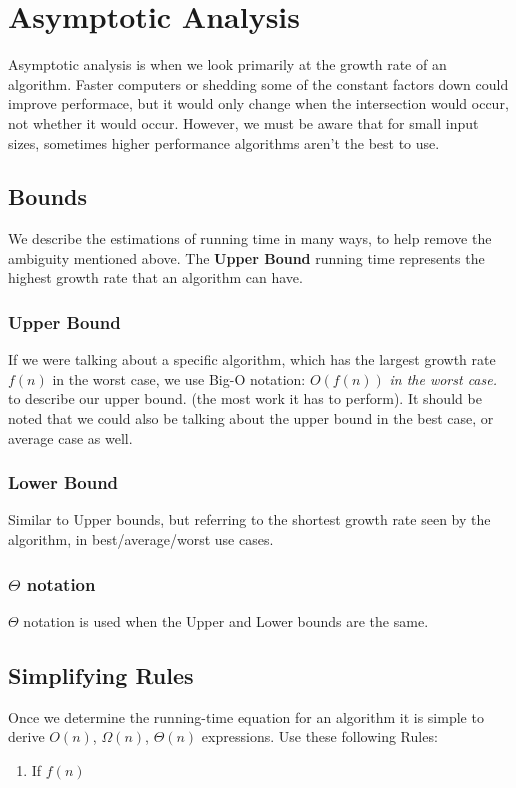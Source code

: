\documentclass{report}
\theoremstyle{definition}
\begin{document}
\section{Asymptotic Analysis}
	Asymptotic analysis is when we look primarily at the growth rate of an algorithm. Faster computers or shedding 
	some of the constant factors down could improve performace, but it would only change when the intersection would 
	occur, not whether it would occur. However, we must be aware that for small input sizes, sometimes higher performance
	algorithms aren't the best to use.
	\subsection{Bounds}
		We describe the estimations of running time in many ways, to help remove the ambiguity mentioned above. The
		\textbf{Upper Bound} running time represents the highest growth rate that an algorithm can have.
		\subsubsection{Upper Bound}
			If we were talking about a specific algorithm, which has the largest growth rate $f(n)$ in the worst case, we use Big-O
			notation: $O(f(n))$ \textit{in the worst case.} to describe our upper bound. (the most work it has to perform). It should
			be noted that we could also be talking about the upper bound in the best case, or average case as well.
		\subsubsection{Lower Bound}
			Similar to Upper bounds, but referring to the shortest growth rate seen by the algorithm, in best/average/worst use cases.
		\subsubsection{$\Theta$ notation}
			$\Theta$ notation is used when the Upper and Lower bounds are the same.
\newpage
	\subsection{Simplifying Rules}
		Once we determine the running-time equation for an algorithm it is simple to derive $O(n)$, $\Omega(n)$, $\Theta(n)$
		expressions. Use these following Rules:
		\begin{enumerate}
			\item If $f(n)$
		\end{enumerate}
\end{document}
